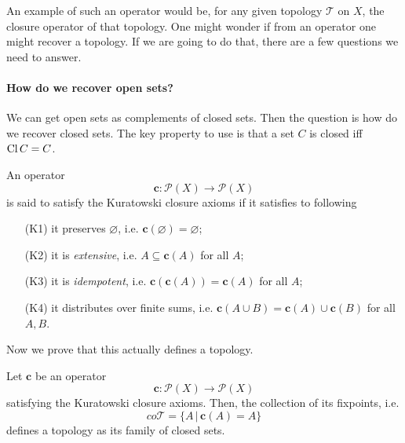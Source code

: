 An example of such an operator would be, for any given topology $\mathcal{T}$ on $X$, the closure operator of that topology. One might wonder if from an operator one might recover a topology. If we are going to do that, there are a few questions we need to answer.

\paragraph{How do we recover open sets?} We can get open sets as complements of closed sets. Then the question is how do we recover closed sets. The key property to use is that a set $C$ is closed iff $\operatorname{Cl} C = C$.

\begin{defn}
    An operator
    \[
        \mathbf{c}: \mathcal{P}(X) \to \mathcal{P}(X)
    \]
    is said to satisfy the Kuratowski closure axioms if it satisfies to following
    \begin{itemize}
        \item[(K1)] it preserves $\varnothing$, i.e. $\mathbf{c}(\varnothing) = \varnothing$;
        \item[(K2)] it is \emph{extensive}, i.e. $A \subseteq \mathbf{c}(A)$ for all $A$;
        \item[(K3)] it is \emph{idempotent}, i.e. $\mathbf{c}(\mathbf{c}(A)) = \mathbf{c}(A)$ for all $A$;
        \item[(K4)] it distributes over finite sums, i.e. $\mathbf{c}(A \cup B) = \mathbf{c}(A) \cup \mathbf{c}(B)$ for all $A, B$.
    \end{itemize}
\end{defn}

Now we prove that this actually defines a topology.
\begin{lemma}
    Let $\mathbf{c}$ be an operator     
    \[
        \mathbf{c}: \mathcal{P}(X) \to \mathcal{P}(X)
    \]
    satisfying the Kuratowski closure axioms. Then, the collection of its fixpoints, i.e.
    \[
        co\mathcal{T} = \{ A \,\vert\, \mathbf{c}(A) = A \}
    \]
    defines a topology as its family of closed sets.
\end{lemma}

